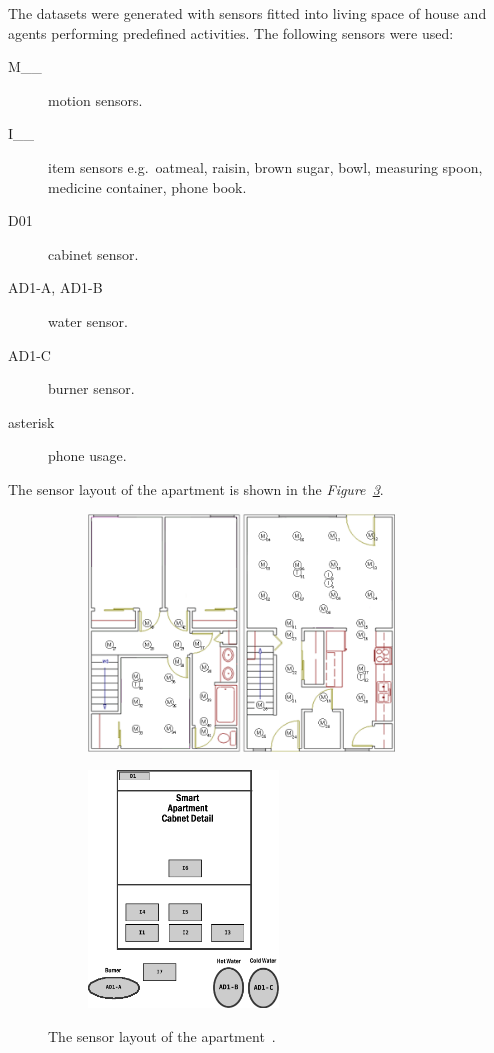 \documentclass[12pt, a4paper, pdflatex, leqno, twoside]{report}
\begin{document}
The datasets were generated with sensors fitted into living space of house and agents performing predefined activities. The following sensors were used:
\begin{description}
\item[M\_\_] motion sensors.
\item[I\_\_] item sensors e.g.\ oatmeal, raisin, brown sugar, bowl, measuring spoon, medicine container, phone book.
\item[D01] cabinet sensor.
\item[AD1-A, AD1-B] water sensor.
\item[AD1-C] burner sensor.
\item[asterisk] phone usage.
\end{description}

The sensor layout of the apartment is shown in the \emph{Figure~\ref{fig:house}}.

\begin{figure}[htb]
  \centering%
  \begin{subfigure}[b]{0.6\textwidth}
    \includegraphics[height=6.3cm]{gfx/Chinook_3_Bedroom_TH}
    \caption{\label{fig:house:a}}
  \end{subfigure}%
  \begin{subfigure}[b]{0.3\textwidth}
    \includegraphics[height=6.3cm]{gfx/Chinook_Cabinet}
    \caption{\label{fig:house:b}}
  \end{subfigure}%
  \caption[The sensor layout of the apartment.]{The sensor layout of the apartment~\citep{cook2009assessing}.\label{fig:house}}
\end{figure}
\end{document}
